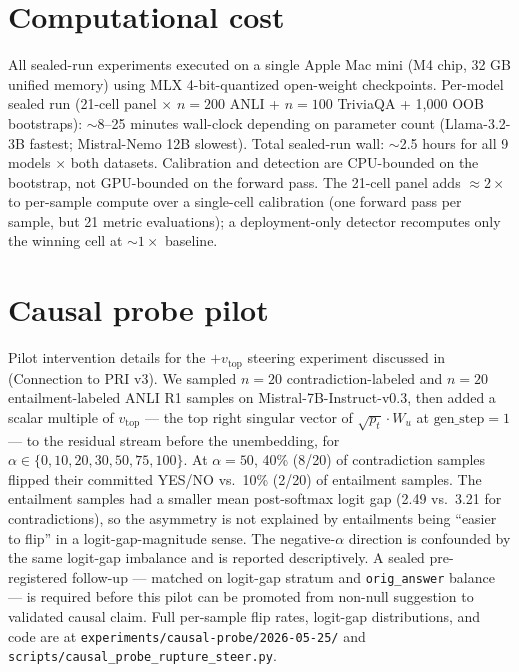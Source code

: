 \documentclass[10pt, letterpaper]{article}
\begin{document}
\section{Computational cost}
\label{app:compute}

All sealed-run experiments executed on a single Apple Mac mini (M4
chip, 32 GB unified memory) using MLX 4-bit-quantized open-weight
checkpoints. Per-model sealed run (21-cell panel $\times$ $n{=}200$
ANLI + $n{=}100$ TriviaQA + 1,000 OOB bootstraps): $\sim$8--25 minutes
wall-clock depending on parameter count (Llama-3.2-3B fastest;
Mistral-Nemo 12B slowest). Total sealed-run wall: $\sim$2.5 hours for
all 9 models $\times$ both datasets. Calibration and detection are
CPU-bounded on the bootstrap, not GPU-bounded on the forward pass.
The 21-cell panel adds $\approx 2\times$ to per-sample compute over a
single-cell calibration (one forward pass per sample, but 21 metric
evaluations); a deployment-only detector recomputes only the winning
cell at $\sim 1\times$ baseline.

\section{Causal probe pilot}
\label{app:causal}

Pilot intervention details for the $+v_\text{top}$ steering experiment
discussed in  (Connection to PRI v3). We sampled
$n{=}20$ contradiction-labeled and $n{=}20$ entailment-labeled
ANLI R1 samples on Mistral-7B-Instruct-v0.3, then added a scalar
multiple of $v_\text{top}$ --- the top right singular vector of
$\sqrt{p_t} \cdot W_u$ at $\text{gen\_step}{=}1$ --- to the residual
stream before the unembedding, for $\alpha \in \{0, 10, 20, 30, 50,
75, 100\}$. At $\alpha{=}50$, 40\% (8/20) of contradiction samples
flipped their committed YES/NO vs.\ 10\% (2/20) of entailment
samples. The entailment samples had a smaller mean post-softmax
logit gap (2.49 vs.\ 3.21 for contradictions), so the asymmetry is
not explained by entailments being ``easier to flip'' in a
logit-gap-magnitude sense. The negative-$\alpha$ direction is
confounded by the same logit-gap imbalance and is reported
descriptively. A sealed pre-registered follow-up --- matched on
logit-gap stratum and \texttt{orig\_answer} balance --- is required
before this pilot can be promoted from non-null suggestion to
validated causal claim. Full per-sample flip rates, logit-gap
distributions, and code are at
\texttt{experiments/causal-probe/2026-05-25/} and
\texttt{scripts/causal\_probe\_rupture\_steer.py}.
\end{document}

